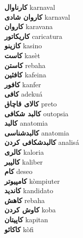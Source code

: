 \textbf{ کارناوال  } karnaval \\
\textbf{ کاروان شادی  } karnaval \\
\textbf{ کاروان  } karavana \\
\textbf{ کاریکاتور  } caricatura \\
\textbf{ کازینو  } kasino \\
\textbf{ کاست  } kasèt \\
\textbf{ کاستن  } rebaha \\
\textbf{ کافئین  } kafeina \\
\textbf{ کافور  } kanfer \\
\textbf{ کافی  } adekuá \\
\textbf{ کالای قاچاق  } preto \\
\textbf{ کالبد شکافی  } outopsia \\
\textbf{ کالبد  } anatomia \\
\textbf{ کالبدشناسی  } anatomia \\
\textbf{ کالبدشکافی کردن  } analisá \\
\textbf{ کالری  } kaloria \\
\textbf{ کالیبر  } kaliber \\
\textbf{ کام  } deseo \\
\textbf{ کامپیوتر  } kòmpiuter \\
\textbf{ کاندید  } kandidato \\
\textbf{ کاهش  } rebaha \\
\textbf{ کاوش کردن  } koba \\
\textbf{ کاپیتان  } kapitan \\
\textbf{ کاکائو  } kòfi \\
